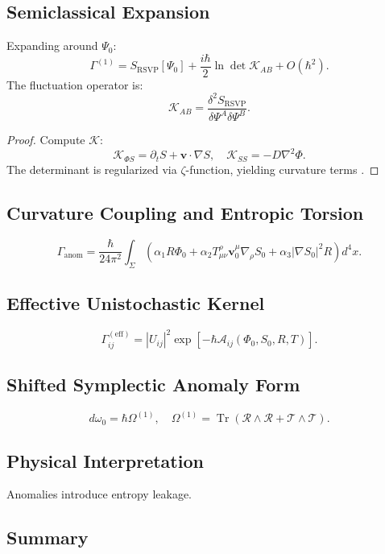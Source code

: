 \documentclass[12pt]{article}
\begin{document}
\subsection{Semiclassical Expansion}

Expanding around \(\Psi_0\):
\[
\Gamma^{(1)} = S_{\mathrm{RSVP}}[\Psi_0] + \frac{i \hbar}{2} \ln \det \mathcal{K}_{AB} + O(\hbar^2).
\]
The fluctuation operator is:
\[
\mathcal{K}_{AB} = \frac{\delta^2 S_{\mathrm{RSVP}}}{\delta \Psi^A \delta \Psi^B}.
\]

\begin{proof}
Compute \(\mathcal{K}\):
\[
\mathcal{K}_{\Phi S} = \partial_t S + \mathbf{v} \cdot \nabla S, \quad \mathcal{K}_{S S} = -D \nabla^2 \Phi.
\]
The determinant is regularized via \(\zeta\)-function, yielding curvature terms \citep{Pantev2013}.
\end{proof}

\subsection{Curvature Coupling and Entropic Torsion}

\[
\Gamma_{\mathrm{anom}} = \frac{\hbar}{24 \pi^2} \int_\Sigma \left( \alpha_1 R \Phi_0 + \alpha_2 T_{\mu\nu}^{\rho} \mathbf{v}_0^\mu \nabla_\rho S_0 + \alpha_3 |\nabla S_0|^2 R \right) d^4x.
\]

\subsection{Effective Unistochastic Kernel}

\[
\Gamma_{ij}^{(\mathrm{eff})} = |U_{ij}|^2 \exp\left[ -\hbar \mathcal{A}_{ij}(\Phi_0, S_0, R, T) \right].
\]

\subsection{Shifted Symplectic Anomaly Form}

\[
d \omega_0 = \hbar \Omega^{(1)}, \quad \Omega^{(1)} = \operatorname{Tr} \left( \mathcal{R} \wedge \mathcal{R} + \mathcal{T} \wedge \mathcal{T} \right).
\]

\subsection{Physical Interpretation}

Anomalies introduce entropy leakage.

\subsection{Summary}
\end{document}
